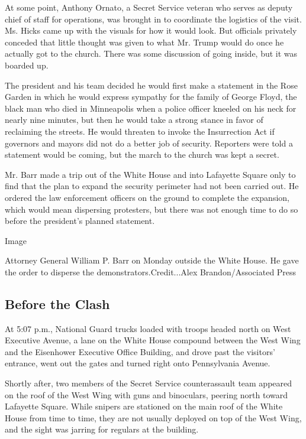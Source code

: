 At some point, Anthony Ornato, a Secret Service veteran who serves as
deputy chief of staff for operations, was brought in to coordinate the
logistics of the visit. Ms. Hicks came up with the visuals for how it
would look. But officials privately conceded that little thought was
given to what Mr. Trump would do once he actually got to the church.
There was some discussion of going inside, but it was boarded up.

The president and his team decided he would first make a statement in
the Rose Garden in which he would express sympathy for the family of
George Floyd, the black man who died in Minneapolis when a police
officer kneeled on his neck for nearly nine minutes, but then he would
take a strong stance in favor of reclaiming the streets. He would
threaten to invoke the Insurrection Act if governors and mayors did not
do a better job of security. Reporters were told a statement would be
coming, but the march to the church was kept a secret.

Mr. Barr made a trip out of the White House and into Lafayette Square
only to find that the plan to expand the security perimeter had not been
carried out. He ordered the law enforcement officers on the ground to
complete the expansion, which would mean dispersing protesters, but
there was not enough time to do so before the president's planned
statement.

Image

Attorney General William P. Barr on Monday outside the White House. He
gave the order to disperse the demonstrators.Credit...Alex
Brandon/Associated Press

\hypertarget{before-the-clash}{%
\subsection{Before the Clash}\label{before-the-clash}}

At 5:07 p.m., National Guard trucks loaded with troops headed north on
West Executive Avenue, a lane on the White House compound between the
West Wing and the Eisenhower Executive Office Building, and drove past
the visitors' entrance, went out the gates and turned right onto
Pennsylvania Avenue.

Shortly after, two members of the Secret Service counterassault team
appeared on the roof of the West Wing with guns and binoculars, peering
north toward Lafayette Square. While snipers are stationed on the main
roof of the White House from time to time, they are not usually deployed
on top of the West Wing, and the sight was jarring for regulars at the
building.

